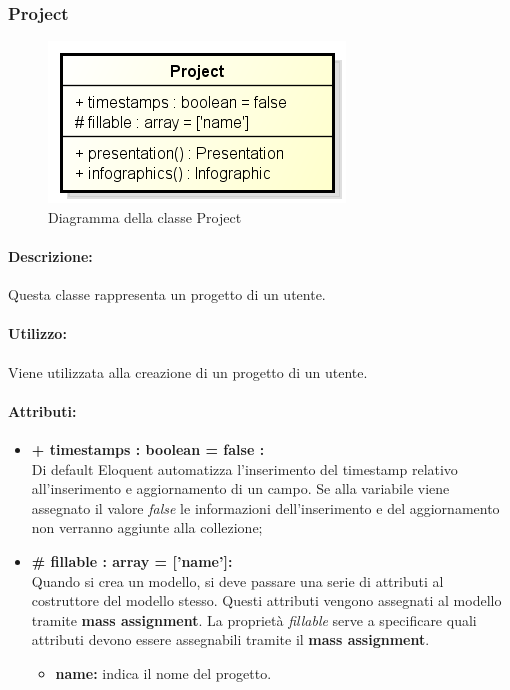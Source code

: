 \subsubsection{Project}

	\begin{figure}[h]
		\centering
		\includegraphics[width=0.5\linewidth]{img/back_end_premi_model_project}
		\caption[Diagramma della classe Project]{Diagramma della classe Project}
		\label{fig:back_end_premi_model_project}
	\end{figure}

	
	\paragraph{Descrizione:}
	Questa classe rappresenta un progetto di un utente.
	
	\paragraph{Utilizzo:}
	Viene utilizzata alla creazione di un progetto di un utente.
	
	\paragraph{Attributi:}
	\begin{itemize}
		\item \textbf{+ timestamps : boolean = false :}\\
		Di default Eloquent automatizza l'inserimento del timestamp relativo all'inserimento e aggiornamento di un campo. Se alla variabile viene assegnato il valore \textit{false} le informazioni dell'inserimento e del aggiornamento non verranno aggiunte alla collezione;
		\item \textbf{\# fillable : array = [’name’]:}\\
		Quando si crea un modello, si deve passare una serie di attributi al costruttore del modello stesso. Questi attributi vengono assegnati al modello tramite \textbf{mass assignment}. La proprietà \textit{fillable} serve a specificare quali attributi devono essere assegnabili tramite il \textbf{mass assignment}.
		\begin{itemize}
			\item \textbf{name:} indica il nome del progetto.
		\end{itemize}
	\end{itemize}
	
